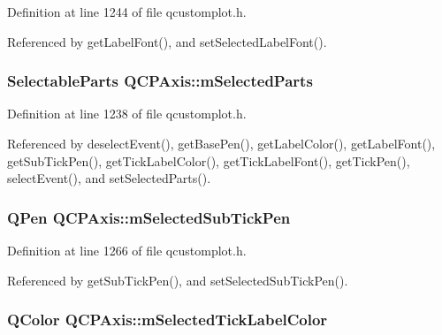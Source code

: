 Definition at line 1244 of file qcustomplot.\+h.



Referenced by get\+Label\+Font(), and set\+Selected\+Label\+Font().

\hypertarget{class_q_c_p_axis_a8f1eb0abfe2ae64652aa46b360e841e4}{}
\subsubsection[{m\+Selected\+Parts}]{\setlength{\rightskip}{0pt plus 5cm}Selectable\+Parts Q\+C\+P\+Axis\+::m\+Selected\+Parts\hspace{0.3cm}{\ttfamily [protected]}}\label{class_q_c_p_axis_a8f1eb0abfe2ae64652aa46b360e841e4}


Definition at line 1238 of file qcustomplot.\+h.



Referenced by deselect\+Event(), get\+Base\+Pen(), get\+Label\+Color(), get\+Label\+Font(), get\+Sub\+Tick\+Pen(), get\+Tick\+Label\+Color(), get\+Tick\+Label\+Font(), get\+Tick\+Pen(), select\+Event(), and set\+Selected\+Parts().

\hypertarget{class_q_c_p_axis_aa5cc6afc5dc2a365f5abbd36eb04a1dc}{}
\subsubsection[{m\+Selected\+Sub\+Tick\+Pen}]{\setlength{\rightskip}{0pt plus 5cm}Q\+Pen Q\+C\+P\+Axis\+::m\+Selected\+Sub\+Tick\+Pen\hspace{0.3cm}{\ttfamily [protected]}}\label{class_q_c_p_axis_aa5cc6afc5dc2a365f5abbd36eb04a1dc}


Definition at line 1266 of file qcustomplot.\+h.



Referenced by get\+Sub\+Tick\+Pen(), and set\+Selected\+Sub\+Tick\+Pen().

\hypertarget{class_q_c_p_axis_a3bcad40902f45dc4c991a2c3e4d31d70}{}
\subsubsection[{m\+Selected\+Tick\+Label\+Color}]{\setlength{\rightskip}{0pt plus 5cm}Q\+Color Q\+C\+P\+Axis\+::m\+Selected\+Tick\+Label\+Color\hspace{0.3cm}{\ttfamily [protected]}}\label{class_q_c_p_axis_a3bcad40902f45dc4c991a2c3e4d31d70}



